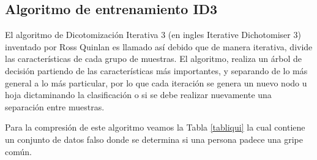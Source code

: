 \documentclass[twoside,spanish,ESP,MSc]{plantillaLabUPV}
\theoremstyle{definition}
\begin{document}
\subsection{Algoritmo de entrenamiento ID3 \cite{c45salz}}

El algoritmo de Dicotomización Iterativa 3 (en ingles Iterative Dichotomiser 3) inventado por Ross Quinlan es llamado así debido que de manera iterativa, divide las características de cada grupo de muestras. El algoritmo, realiza un árbol de decisión partiendo de las características más importantes, y separando de lo más general a lo más particular, por lo que cada iteración se genera un nuevo nodo u hoja dictaminando la clasificación o si se debe realizar nuevamente una separación entre muestras.

Para la compresión de este algoritmo veamos la Tabla \ref{tabliqui} la cual contiene un conjunto de datos falso donde se determina si una persona padece una gripe común. 
\end{document}
